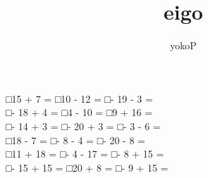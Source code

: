 \documentclass[uplatex,
paper=a4,
fontsize=18pt,
jafontsize=16pt,
number_of_lines=30,
line_length=30zh,
baselineskip=25pt,
]{jlreq}
\author{yokoP}
\title{eigo}
\begin{document}
□\hspace{1em}15 + 7 =\hspace{2em} □\hspace{1em}10 - 12 =\hspace{2em} □\hspace{1em}- 19 - 3 =\hspace{2em} 
\\

□\hspace{1em}- 18 + 4 =\hspace{2em} □\hspace{1em}4 - 10 =\hspace{2em} □\hspace{1em}9 + 16 =\hspace{2em} 
\\

□\hspace{1em}- 14 + 3 =\hspace{2em} □\hspace{1em}- 20 + 3 =\hspace{2em} □\hspace{1em}- 3 - 6 =\hspace{2em} 
\\

□\hspace{1em}18 - 7 =\hspace{2em} □\hspace{1em}- 8 - 4 =\hspace{2em} □\hspace{1em}- 20 - 8 =\hspace{2em} 
\\

□\hspace{1em}11 + 18 =\hspace{2em} □\hspace{1em}- 4 - 17 =\hspace{2em} □\hspace{1em}- 8 + 15 =\hspace{2em} 
\\

□\hspace{1em}- 15 + 15 =\hspace{2em} □\hspace{1em}20 + 8 =\hspace{2em} □\hspace{1em}- 9 + 15 =\hspace{2em} 
\\
\end{document}
